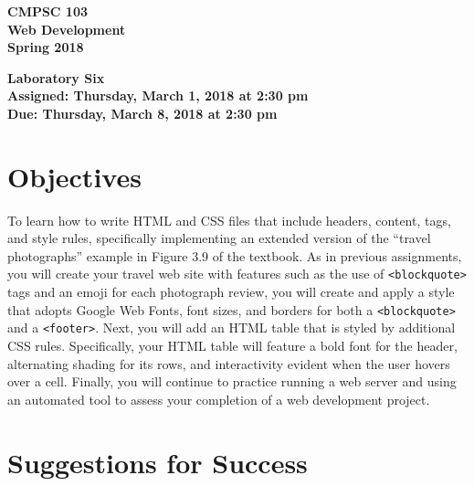 \documentclass[11pt]{article}
\newcommand{\assignmentduedate}{March 8}
\newcommand{\assignmentassignedate}{March 1}
\newcommand{\assignmentnumber}{Six}
\newcommand{\labyear}{2018}
\newcommand{\labday}{Thursday}
\newcommand{\labtime}{2:30 pm}
\newcommand{\assigneddate}{Assigned: \labday, \assignmentassignedate, \labyear{} at \labtime{}}
\newcommand{\duedate}{Due: \labday, \assignmentduedate, \labyear{} at \labtime{}}
\newcommand{\program}[1]{\lstinline{#1}}
\newcommand{\labtitle}[1]
{
  \begin{center}
    \begin{center}
      \bf
      CMPSC 103\\Web Development\\
      Spring 2018\\
      \medskip
    \end{center}
    \bf
    #1
  \end{center}
}
\begin{document}
\thispagestyle{empty}

\labtitle{Laboratory \assignmentnumber{} \\ \assigneddate{} \\ \duedate{}}

\section*{Objectives}

To learn how to write HTML and CSS files that include headers, content, tags,
and style rules, specifically implementing an extended version of the ``travel
photographs'' example in Figure 3.9 of the textbook. As in previous assignments,
you will create your travel web site with features such as the use of
\program{<blockquote>} tags and an emoji for each photograph review, you will
create and apply a style that adopts Google Web Fonts, font sizes, and borders
for both a \program{<blockquote>} and a \program{<footer>}. Next, you will add
an HTML table that is styled by additional CSS rules. Specifically, your HTML
table will feature a bold font for the header, alternating shading for its rows,
and interactivity evident when the user hovers over a cell. Finally, you will
continue to practice running a web server and using an automated tool to assess
your completion of a web development project.

\section*{Suggestions for Success}
\end{document}
